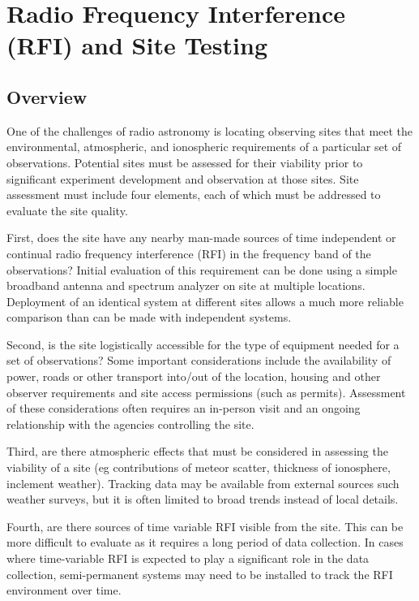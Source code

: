 \chapter{Radio Frequency Interference (RFI) and Site Testing} \label{Ch:RFI}

\section{Overview}

One of the challenges of radio astronomy is locating observing sites that meet the environmental, atmospheric, and ionospheric requirements of a particular set of observations. Potential sites must be assessed for their viability prior to significant experiment development and observation at those sites. Site assessment must include four elements, each of which must be addressed to evaluate the site quality. 

First, does the site have any nearby man-made sources of time independent or continual radio frequency interference (RFI) in the frequency band of the observations? Initial evaluation of this requirement can be done using a simple broadband antenna and spectrum analyzer on site at multiple locations. Deployment of an identical system at different sites allows a much more reliable comparison than can be made with independent systems. 

Second, is the site logistically accessible for the type of equipment needed for a set of observations? Some important considerations include the availability of power, roads or other transport into/out of the location, housing and other observer requirements and site access permissions (such as permits). Assessment of these considerations often requires an in-person visit and an ongoing relationship with the agencies controlling the site.

Third, are there atmospheric effects that must be considered in assessing the viability of a site (eg contributions of meteor scatter, thickness of ionosphere, inclement weather). Tracking data may be available from external sources such weather surveys, but it is often limited to broad trends instead of local details. 

Fourth, are there sources of time variable RFI visible from the site. This can be more difficult to evaluate as it requires a long period of data collection. In cases where time-variable RFI is expected to play a significant role in the data collection, semi-permanent systems may need to be installed to track the RFI environment over time. 

